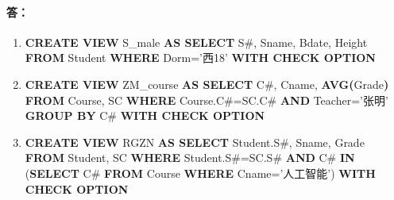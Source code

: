 \paragraph{答：}
\begin{enumerate}
	\item \textbf{CREATE VIEW} S\_male \textbf{AS SELECT} S\#, Sname, Bdate, Height \textbf{FROM} Student \textbf{WHERE} Dorm='西18' \textbf{WITH CHECK OPTION}
	
	\item \textbf{CREATE VIEW} ZM\_course \textbf{AS SELECT} C\#, Cname, \textbf{AVG(}Grade\textbf{)} \textbf{FROM} Course, SC \textbf{WHERE} Course.C\#=SC.C\# \textbf{AND} Teacher='张明' \textbf{GROUP BY} C\# \textbf{WITH CHECK OPTION}
	
	\item \textbf{CREATE VIEW} RGZN \textbf{AS SELECT} Student.S\#, Sname, Grade \textbf{FROM} Student, SC \textbf{WHERE} Student.S\#=SC.S\# \textbf{AND} C\# \textbf{IN} (\textbf{SELECT} C\# \textbf{FROM} Course \textbf{WHERE} Cname='人工智能') \textbf{WITH CHECK OPTION}
\end{enumerate}